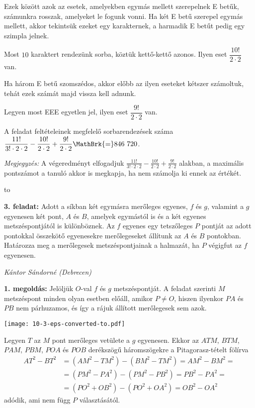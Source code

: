 \documentclass[a4paper,10pt]{article}
\newcommand{\ki}[2]{\hfill {\it #1 (#2)}\medskip}
\newcommand{\vonal}{\hbox to \hsize{\hskip2truecm\hrulefill\hskip2truecm}}
\begin{document}
\smallskip

\noindent Ezek között azok az esetek, amelyekben egymás mellett szerepelnek E betűk, számunkra rosszak, amelyeket le fogunk vonni. Ha két E betű szerepel egymás mellett, akkor tekintsük ezeket egy karakternek, a harmadik E betűt pedig egy szimpla jelnek.

\smallskip

\noindent Most $10$ karaktert rendezünk sorba, köztük kettő-kettő azonos. Ilyen eset $\dfrac {10!}{2\cdot 2}$ van.


\noindent Ha három E betű szomszédos, akkor előbb az ilyen eseteket kétszer számoltuk, tehát ezek számát majd vissza kell adnunk. 

\smallskip

\noindent Legyen most  EEE  egyetlen jel, ilyen eset $\dfrac {9!}{2\cdot 2}$ van.

\smallskip

\noindent A feladat feltételeinek megfelelő sorbarendezések száma $\displaystyle\frac {11!}{3! \cdot  2\cdot 2}- \frac {10!}{2\cdot 2}+\frac {9!}{2\cdot 2}\MathBrk{=}846\ 720$. 

\smallskip

\emph{Megjegyzés:} A végeredményt elfogadjuk $\displaystyle\frac {11!}{3! \cdot  2\cdot 2}- \frac {10!}{2\cdot 2}+\frac {9!}{2\cdot 2}$ alakban, a maximális pontszámot a tanuló akkor is megkapja, ha nem számolja ki ennek az értékét.

\vonal

{\bf 3. feladat: } Adott a síkban két egymásra merőleges egyenes, $f$ és $g$, valamint a $g$ egyenesen két pont, $A$ és $B$, amelyek egymástól is és a két egyenes metszéspontjától is különböznek. Az $f$ egyenes egy tetszőleges $P$ pontját az adott pontokkal összekötő egyenesekre merőlegeseket állítunk az $A$ és $B$ pontokban. Határozza meg a merőlegesek metszéspontjainak a halmazát, ha $P$ végigfut az $f$ egyenesen.

\ki{Kántor Sándorné}{Debrecen}\medskip

{\bf 1. megoldás: } Jelöljük $O$-val $f$ és $g$ metszéspontját. A feladat szerinti $M$ metszéspont minden olyan esetben előáll, amikor $P\ne O$, hiszen ilyenkor $PA$ és $PB$ nem párhuzamos, és így a rájuk állított merőlegesek sem azok.

\begin{center}
\texttt{[image: 10-3-eps-converted-to.pdf]}
\end{center}

\noindent Legyen $T$ az $M$ pont merőleges vetülete a $g$ egyenesen. Ekkor az $ATM$, $BTM$, $PAM$, $PBM$, $POA$ és $POB$ derékszögű háromszögekre a Pitagorasz-tételt fölírva
\begin{align*}
AT^2-BT^2 & =  (AM^2-TM^2)-(BM^2-TM^2)= AM^2-BM^2= \\
& =  (PM^2-PA^2)-(PM^2-PB^2) = PB^2-PA^2= \\
& =  (PO^2+OB^2)-(PO^2+OA^2) = OB^2-OA^2
\end{align*}
adódik, ami nem függ $P$ választásától.
\end{document}
